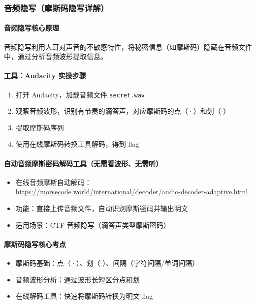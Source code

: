 \subsubsection{音频隐写（摩斯码隐写详解）}
\paragraph{音频隐写核心原理}
音频隐写利用人耳对声音的不敏感特性，将秘密信息（如摩斯码）隐藏在音频文件中，通过分析音频波形提取信息。

\paragraph{工具：Audacity 实操步骤}
\begin{enumerate}[leftmargin=*]
    \item 打开 Audacity，加载音频文件 \texttt{secret.wav}
    \item 观察音频波形，识别有节奏的滴答声，对应摩斯码的点（·）和划（-）
    \item 提取摩斯码序列
    \item 使用在线摩斯码转换工具解码，得到 flag
\end{enumerate}

\paragraph{自动音频摩斯密码解码工具（无需看波形、无需听）}
\begin{itemize}[leftmargin=*]
    \item 在线音频摩斯自动解码：\url{https://morsecode.world/international/decoder/audio-decoder-adaptive.html}
    \item 功能：直接上传音频文件，自动识别摩斯密码并输出明文
    \item 适用场景：CTF 音频隐写（滴答声类型摩斯密码）
\end{itemize}

\paragraph{摩斯码隐写核心考点}
\begin{itemize}[leftmargin=*]
    \item 摩斯码基础：点（·）、划（-）、间隔（字符间隔/单词间隔）
    \item 音频波形分析：通过波形长短区分点和划
    \item 在线解码工具：快速将摩斯码转换为明文 flag
\end{itemize}

